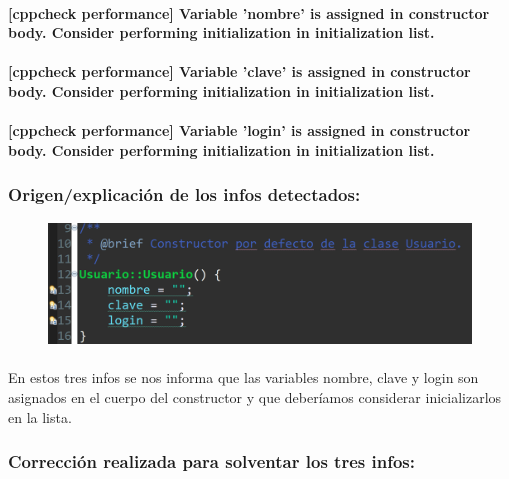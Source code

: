 		\paragraph{[cppcheck performance] Variable 'nombre' is assigned in constructor body. Consider performing initialization in initialization list.}
		
		\paragraph{[cppcheck performance] Variable 'clave' is assigned in constructor body. Consider performing initialization in initialization list.}
		
		\paragraph{[cppcheck performance] Variable 'login' is assigned in constructor body. Consider performing initialization in initialization list.}
	
		\subsubsection{Origen/explicación de los infos detectados:}
		
			\begin{figure}[H]
				\centering
				\includegraphics[scale=0.55]{img/esteban28.png}
				\label{esteban28}
			\end{figure}
		
			\paragraph{}En estos tres infos se nos informa que las variables nombre, clave y login son asignados en el cuerpo del constructor y que deberíamos considerar inicializarlos en la lista.
			
		\subsubsection{Corrección realizada para solventar los tres infos:}
		
